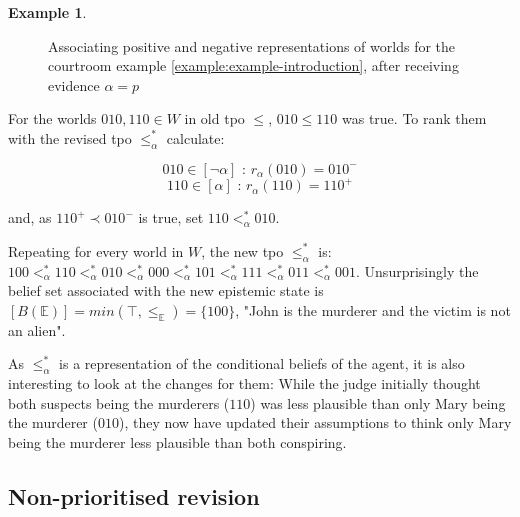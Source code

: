 \documentclass[english, 12pt]{scrartcl}
\theoremstyle{definition}
\newtheorem{example}{Example}[section]
\theoremstyle{definition}
\theoremstyle{definition}
\begin{document}
\begin{example}
\begin{figure}[h]
            \caption{Associating positive and negative representations of worlds for the courtroom example \ref{example:example-introduction}, after receiving evidence $\alpha=p$}
            \label{fig:example-tpo-revised}
    \end{figure}
    
    For the worlds $010, 110 \in W$ in old tpo $\leq$, $010 \leq 110$ was true. To rank them with the revised tpo $\leq_{\alpha}^{\ast}$ calculate:
    
    \begin{equation*}
        010 \in [\neg\alpha] \textrm{ : } r_{\alpha}(010) = 010^{-}
    \end{equation*}
    \begin{equation*}
        110 \in [\alpha] \textrm{ : } r_{\alpha}(110) = 110^{+}
    \end{equation*}
    
    and, as $110^{+} \prec 010^{-}$ is true, set $110 <_{\alpha}^{\ast} 010$.
    
    Repeating for every world in $W$, the new tpo $\leq_{\alpha}^{\ast}$ is: $100 <_{\alpha}^{\ast} 110 <_{\alpha}^{\ast} 010 <_{\alpha}^{\ast} 000 <_{\alpha}^{\ast} 101 <_{\alpha}^{\ast} 111 <_{\alpha}^{\ast} 011 <_{\alpha}^{\ast} 001$. Unsurprisingly the belief set associated with the new epistemic state is $[B(\mathbb{E})] = min(\top, \leq_{\mathbb{E}}) = \{100\}$, "John is the murderer and the victim is not an alien".
    
    As $\leq_{\alpha}^{\ast}$ is a representation of the conditional beliefs of the agent, it is also interesting to look at the changes for them: While the judge initially thought both suspects being the murderers ($110$) was less plausible than only Mary being the murderer ($010$), they now have updated their assumptions to think only Mary being the murderer less plausible than both conspiring.
\end{example}

\subsection{Non-prioritised revision}
\label{section:non-prioritised-revision}
\end{document}
